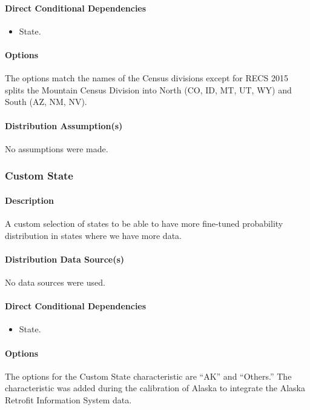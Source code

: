 \paragraph{Direct Conditional Dependencies}
\begin{itemize}
    \item State.
\end{itemize}

\paragraph{Options}
The options match the names of the Census divisions except for RECS 2015 splits the Mountain Census Division into North (CO, ID, MT, UT, WY) and South (AZ, NM, NV).

\paragraph{Distribution Assumption(s)}
No assumptions were made.

\subsubsection{Custom State}
\paragraph{Description}
A custom selection of states to be able to have more fine-tuned probability distribution in states where we have more data.

\paragraph{Distribution Data Source(s)}
No data sources were used.

\paragraph{Direct Conditional Dependencies}
\begin{itemize}
    \item State.
\end{itemize}
\paragraph{Options}
The options for the Custom State characteristic are ``AK'' and ``Others.'' The characteristic was added during the calibration of Alaska to integrate the Alaska Retrofit Information System data.

